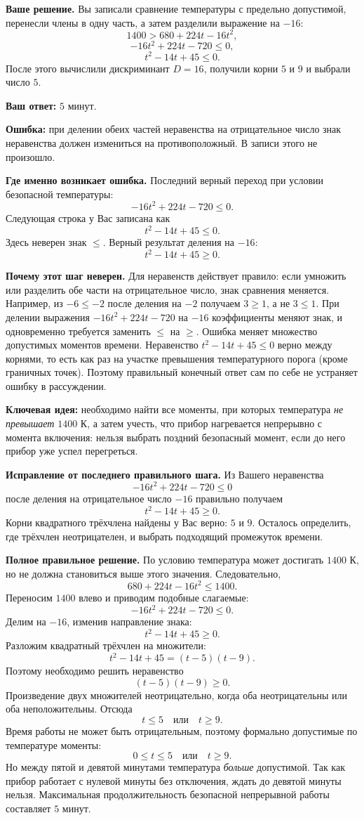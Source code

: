 \documentclass[12pt,a4paper]{article}
\newcommand{\ReviewField}[1]{{\color{ReviewTeal}\bfseries #1}\space}
\newcommand{\ReviewError}[1]{{\color{ReviewErrorInk}\bfseries #1}\space}
\begin{document}
\ReviewField{Ваше решение.} Вы записали сравнение температуры с предельно допустимой, перенесли члены в одну часть, а затем разделили выражение на $-16$:
\[
1400>680+224t-16t^2,
\]
\[
-16t^2+224t-720\le 0,
\]
\[
t^2-14t+45\le0.
\]
После этого вычислили дискриминант $D=16$, получили корни $5$ и $9$ и выбрали число $5$.

\ReviewField{Ваш ответ:} $5$ минут.

\ReviewError{Ошибка:} при делении обеих частей неравенства на отрицательное число знак неравенства должен измениться на противоположный. В записи этого не произошло.

\ReviewField{Где именно возникает ошибка.} Последний верный переход при условии безопасной температуры:
\[
-16t^2+224t-720\le0.
\]
Следующая строка у Вас записана как
\[
t^2-14t+45\le0.
\]
Здесь неверен знак $\le$. Верный результат деления на $-16$:
\[
\boxed{t^2-14t+45\ge0}.
\]

\ReviewField{Почему этот шаг неверен.} Для неравенств действует правило: если умножить или разделить обе части на отрицательное число, знак сравнения меняется. Например, из $-6\le-2$ после деления на $-2$ получаем $3\ge1$, а не $3\le1$. При делении выражения $-16t^2+224t-720$ на $-16$ коэффициенты меняют знак, и одновременно требуется заменить $\le$ на $\ge$. Ошибка меняет множество допустимых моментов времени. Неравенство $t^2-14t+45\le0$ верно между корнями, то есть как раз на участке превышения температурного порога (кроме граничных точек). Поэтому правильный конечный ответ сам по себе не устраняет ошибку в рассуждении.

\ReviewField{Ключевая идея:} необходимо найти все моменты, при которых температура \emph{не превышает} $1400$ К, а затем учесть, что прибор нагревается непрерывно с момента включения: нельзя выбрать поздний безопасный момент, если до него прибор уже успел перегреться.

\ReviewField{Исправление от последнего правильного шага.} Из Вашего неравенства
\[
-16t^2+224t-720\le0
\]
после деления на отрицательное число $-16$ правильно получаем
\[
t^2-14t+45\ge0.
\]
Корни квадратного трёхчлена найдены у Вас верно: $5$ и $9$. Осталось определить, где трёхчлен неотрицателен, и выбрать подходящий промежуток времени.

\ReviewField{Полное правильное решение.} По условию температура может достигать $1400$ К, но не должна становиться выше этого значения. Следовательно,
\[
680+224t-16t^2\le1400.
\]
Переносим $1400$ влево и приводим подобные слагаемые:
\[
-16t^2+224t-720\le0.
\]
Делим на $-16$, изменив направление знака:
\[
t^2-14t+45\ge0.
\]
Разложим квадратный трёхчлен на множители:
\[
t^2-14t+45=(t-5)(t-9).
\]
Поэтому необходимо решить неравенство
\[
(t-5)(t-9)\ge0.
\]
Произведение двух множителей неотрицательно, когда оба неотрицательны или оба неположительны. Отсюда
\[
t\le5\quad\text{или}\quad t\ge9.
\]
Время работы не может быть отрицательным, поэтому формально допустимые по температуре моменты:
\[
0\le t\le5\quad\text{или}\quad t\ge9.
\]
Но между пятой и девятой минутами температура \emph{больше} допустимой. Так как прибор работает с нулевой минуты без отключения, ждать до девятой минуты нельзя. Максимальная продолжительность безопасной непрерывной работы составляет $5$ минут.
\end{document}
